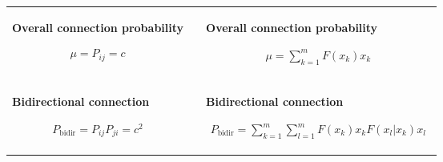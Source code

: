 \begin{frame}{}
\begin{tabular}{  p{}   p{}  p{} }
    \\
    
    \textbf{Overall connection probability}
    \vspace{0.12cm}
    
    \begin{align*}
      \mu = P_{ij} = c
    \end{align*}


    &&

    \textbf{Overall connection probability}
    \vspace{-0.08cm}
    
    \begin{align*}
      \mu = \sum_{k=1}^m F(x_k) x_k
    \end{align*}
    
    \\

    \textbf{Bidirectional connection}
    \vspace{0.12cm}
    
    \begin{align*}
      P_{\text{bidir}} = P_{ij} P_{ji} = c^2
    \end{align*}	

    &&

    \textbf{Bidirectional connection}
    \vspace{-0.08cm}
    
    \begin{align*}
      P_{\text{bidir}} = \sum_{k=1}^m \sum_{l=1}^m F(x_k) x_k F(x_l | x_k) x_l %
    \end{align*}	
    
  \end{tabular}


  
\end{frame}



